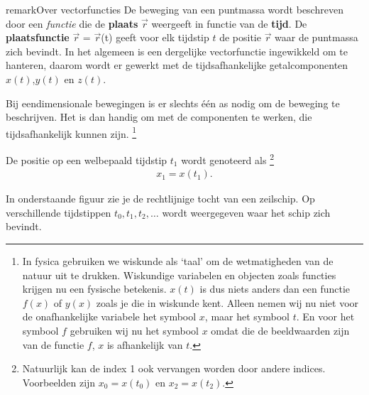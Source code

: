 \documentclass{ximera}
\begin{document}
\begin{expandable}{remark}{Over vectorfuncties}
	De beweging van een puntmassa wordt beschreven door een \textit{functie} die de \textbf{plaats} \(\vec{r}\) weergeeft in functie van de \textbf{tijd}. De \textbf{plaatsfunctie} \(\vec{r}\) = \(\vec{r}\)(t) geeft voor elk tijdstip \(t\) de positie \(\vec{r}\) waar de puntmassa zich bevindt. In het algemeen is een dergelijke vectorfunctie ingewikkeld om te hanteren, daarom wordt er gewerkt met de tijdsafhankelijke getalcomponenten \(x(t)\),\(y(t)\) en \(z(t)\).
\end{expandable}

Bij eendimensionale bewegingen is er slechts één as nodig om de beweging te beschrijven. Het is dan handig om met de componenten te werken, die tijdsafhankelijk kunnen zijn.%
\footnote{
	In fysica gebruiken we wiskunde als `taal' om de wetmatigheden van de natuur uit te drukken. Wiskundige variabelen en objecten zoals functies krijgen nu een fysische betekenis. $x(t)$ is dus niets anders dan een functie $f(x)$ of $y(x)$ zoals je die in wiskunde kent. Alleen nemen wij nu niet voor de onafhankelijke variabele het symbool $x$, maar het symbool $t$. 
	En voor het symbool $f$ gebruiken wij nu het symbool $x$ omdat die de beeldwaarden zijn van de functie \(f\), \(x\) is afhankelijk van \(t\).
}


De positie op een welbepaald tijdstip $t_1$ wordt genoteerd als
\footnote{Natuurlijk kan de index 1 ook vervangen worden door andere indices. Voorbeelden zijn $x_0=x(t_0)$ en $x_2=x(t_2)$.} 
\begin{eqnarray*}
	x_1=x(t_1).
\end{eqnarray*}

In onderstaande figuur zie je de rechtlijnige tocht van een zeilschip. 
Op verschillende tijdstippen $t_0,t_1, t_2,\ldots$ wordt weergegeven waar het schip zich bevindt. 


\end{document}

